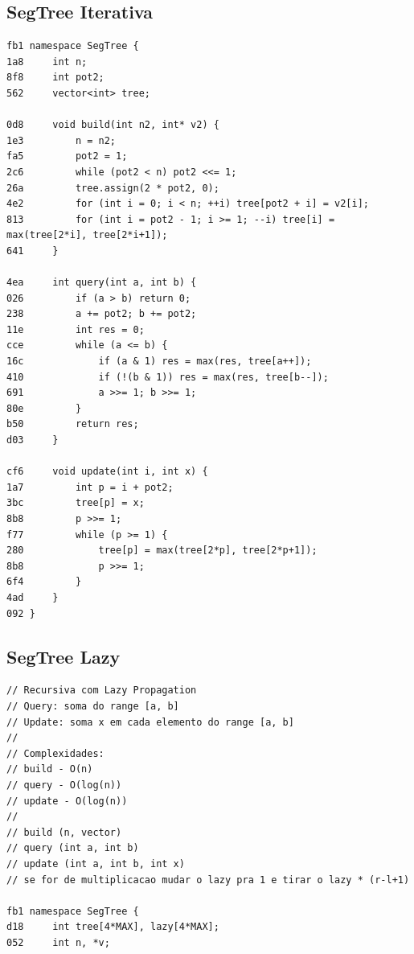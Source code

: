 \documentclass[11pt, a4paper, twoside]{article}
\begin{document}
{\subsection{SegTree Iterativa}
\begin{lstlisting}
fb1 namespace SegTree {
1a8     int n;
8f8     int pot2;
562     vector<int> tree;
    
0d8     void build(int n2, int* v2) {
1e3         n = n2;
fa5         pot2 = 1;
2c6         while (pot2 < n) pot2 <<= 1;
26a         tree.assign(2 * pot2, 0);
4e2         for (int i = 0; i < n; ++i) tree[pot2 + i] = v2[i];
813         for (int i = pot2 - 1; i >= 1; --i) tree[i] = max(tree[2*i], tree[2*i+1]);
641     }
    
4ea     int query(int a, int b) {
026         if (a > b) return 0;
238         a += pot2; b += pot2;
11e         int res = 0;
cce         while (a <= b) {
16c             if (a & 1) res = max(res, tree[a++]);
410             if (!(b & 1)) res = max(res, tree[b--]);
691             a >>= 1; b >>= 1;
80e         }
b50         return res;
d03     }
    
cf6     void update(int i, int x) {
1a7         int p = i + pot2;
3bc         tree[p] = x;
8b8         p >>= 1;
f77         while (p >= 1) {
280             tree[p] = max(tree[2*p], tree[2*p+1]);
8b8             p >>= 1;
6f4         }
4ad     }
092 }
\end{lstlisting}

\subsection{SegTree Lazy}
\begin{lstlisting}
// Recursiva com Lazy Propagation
// Query: soma do range [a, b]
// Update: soma x em cada elemento do range [a, b]
//
// Complexidades:
// build - O(n)
// query - O(log(n))
// update - O(log(n))
//
// build (n, vector)
// query (int a, int b)
// update (int a, int b, int x)
// se for de multiplicacao mudar o lazy pra 1 e tirar o lazy * (r-l+1)

fb1 namespace SegTree {
d18 	int tree[4*MAX], lazy[4*MAX];
052 	int n, *v;
    

\end{lstlisting}}
\end{document}

